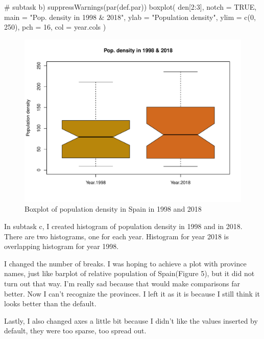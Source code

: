\documentclass[12pt, oneside]{report}\usepackage[]{graphicx}\usepackage[]{color}
\begin{document}
\begin{Schunk}
\begin{Sinput}
# subtask b)
suppressWarnings(par(def.par))
boxplot(
  den[2:3],
  notch = TRUE,
  main = "Pop. density in 1998 & 2018",
  ylab = "Population density",
  ylim = c(0, 250),
  pch = 16,
  col = year.cols
)
\end{Sinput}
\begin{figure}[h]

{\centering \includegraphics[width=.6\textheight,height=.45\textheight]{figure/unnamed-chunk-13-1} 

}

\caption[Boxplot of population density in Spain in 1998 and 2018]{Boxplot of population density in Spain in 1998 and 2018}\label{fig:unnamed-chunk-13}
\end{figure}
\end{Schunk}

\newpage
\noindet In subtask c, I created histogram of population density in 1998 and in 2018. There are two histograms, one for each year. Histogram for year 2018 is overlapping histogram for year 1998.

I changed the number of breaks. I was hoping to achieve a plot with province names, just like barplot of relative population of Spain(Figure 5), but it did not turn out that way. I'm really sad because that would make comparisons far better. Now I can't recognize the provinces.
I left it as it is because I still think it looks better than the default.

Lastly, I also changed axes a little bit because I didn't like the values inserted by default, they were too sparse, too spread out. 
\end{document}

